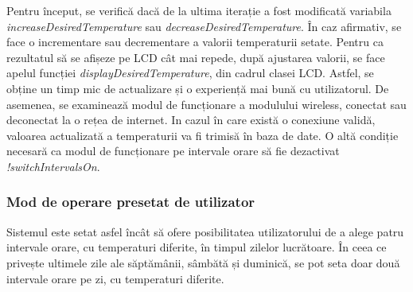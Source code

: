 \vspace{2em}	

	Pentru început, se verifică dacă de la ultima iterație a fost modificată variabila \textit{increaseDesiredTemperature} sau \textit{decreaseDesiredTemperature}. În caz afirmativ, se face o incrementare sau decrementare a valorii temperaturii setate. Pentru ca rezultatul să se afișeze pe LCD cât mai repede, după ajustarea valorii, se face apelul funcției \textit{displayDesiredTemperature}, din cadrul clasei LCD. Astfel, se obține un timp mic de actualizare și o experiență mai bună cu utilizatorul. De asemenea, se examinează modul de funcționare a modulului wireless, conectat sau deconectat la o rețea de internet. In cazul în care există o conexiune validă, valoarea actualizată a temperaturii va fi trimisă în baza de date. O altă condiție necesară ca modul de funcționare pe intervale orare să fie dezactivat  \textit{!switchIntervalsOn}.

\subsubsection{Mod de operare presetat de utilizator}

	Sistemul este setat asfel încât să ofere posibilitatea utilizatorului de a alege patru intervale orare, cu temperaturi diferite, în timpul zilelor lucrătoare. În ceea ce privește ultimele zile ale săptămânii, sâmbătă și duminică, se pot seta doar două intervale orare pe zi, cu temperaturi diferite.


\vspace{1em}

